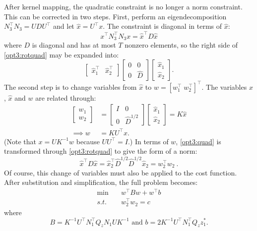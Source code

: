 \documentclass[conference]{IEEEtran}
\begin{document}
After kernel mapping, the quadratic constraint is no longer a norm
constraint. This can be corrected in two steps. First, perform an
eigendecomposition $N_3^\top N_3 = UDU^\top$ and let $\hat{x} = U^\top
x$. The constraint is diagonal in terms of $\hat{x}$:
\begin{equation}
\label{opt3:rotquad} x^\top N_3^\top N_3 x = \hat{x}^\top D\hat{x}
\end{equation}
where $D$ is diagonal and has at most $T$ nonzero elements, so the
right side of \eqref{opt3:rotquad} may be expanded into:
\begin{equation}
\begin{bmatrix}
\hat{x}_1^\top & \hat{x}_2^\top \end{bmatrix}
\begin{bmatrix} 0 & 0 \\ 0 & \hat{D} \end{bmatrix}
\begin{bmatrix}
\hat{x}_1 \\ \hat{x}_2
\end{bmatrix}.
\end{equation}
The second step is to change variables from $\hat{x}$ to $w =
[w_1^\top \; w_2^\top]^\top$. The variables $x$, $\hat{x}$ and $w$ are
related through:
\begin{align}
\label{eq:x_to_w} \begin{bmatrix} w_1 \\ w_2 \end{bmatrix} &=
\begin{bmatrix} I & 0 \\ 0 & \hat{D}^{1/2} \end{bmatrix}
\begin{bmatrix} \hat{x}_1 \\ \hat{x}_2 \end{bmatrix} = K\hat{x} \\
\nonumber \implies w &= KU^\top x.
\end{align}
(Note that $x = UK^{-1}w$ because $UU^\top = I$.) In terms of $w$,
\eqref{opt3:quad} is transformed through \eqref{opt3:rotquad} to give
the form of a norm:
\begin{equation}
\hat{x}^\top D\hat{x} = \hat{x}_2^\top \hat{D}^{1/2}\hat{D}^{1/2}\hat{x}_2
= w_2^\top w_2~.
\end{equation}
Of course, this change of variables must also be applied to the cost function. After substitution and simplification, the full problem becomes:
\begin{subequations}\label{opt4}
\begin{align}
\label{opt4:obj} \min\quad &w^\top Bw + w^\top b \\
\label{opt4:quad} s.t.\quad &w_2^\top w_2 = c
\end{align}
\end{subequations}
where 
\[
B= K^{-1}U^\top N_1^\top Q_z N_1 UK^{-1} \text{ and }b=2 K^{-1}U^\top
N_1^\top Q_z z_1^*.
\]
\end{document}

